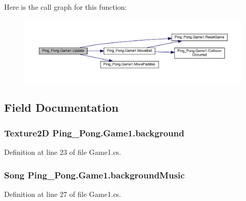 Here is the call graph for this function\-:
\nopagebreak
\begin{figure}[H]
\begin{center}
\leavevmode
\includegraphics[width=350pt]{class_ping___pong_1_1_game1_adcf5d3a66fa192e3318b14188dd0c34a_cgraph}
\end{center}
\end{figure}




\subsection{Field Documentation}
\hypertarget{class_ping___pong_1_1_game1_ae0f525562a3eb615b556f4a9a1eda3e7}{
\subsubsection[{background}]{\setlength{\rightskip}{0pt plus 5cm}Texture2\-D Ping\-\_\-\-Pong.\-Game1.\-background\hspace{0.3cm}{\ttfamily [private]}}}\label{class_ping___pong_1_1_game1_ae0f525562a3eb615b556f4a9a1eda3e7}


Definition at line 23 of file Game1.\-cs.

\hypertarget{class_ping___pong_1_1_game1_ab6439b5c8bcfb4ba77f2a62ab4c73213}{
\subsubsection[{background\-Music}]{\setlength{\rightskip}{0pt plus 5cm}Song Ping\-\_\-\-Pong.\-Game1.\-background\-Music\hspace{0.3cm}{\ttfamily [private]}}}\label{class_ping___pong_1_1_game1_ab6439b5c8bcfb4ba77f2a62ab4c73213}


Definition at line 27 of file Game1.\-cs.

